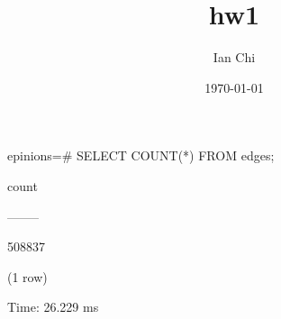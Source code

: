 \documentclass{article}
\title{hw1}
\author{Ian Chi}
\date{\today}
\begin{document}
\maketitle

\section{}
epinions=\# SELECT COUNT(*) FROM edges;

 count
 
--------

 508837
 
(1 row)


Time: 26.229 ms

\section{}
\end{document}

